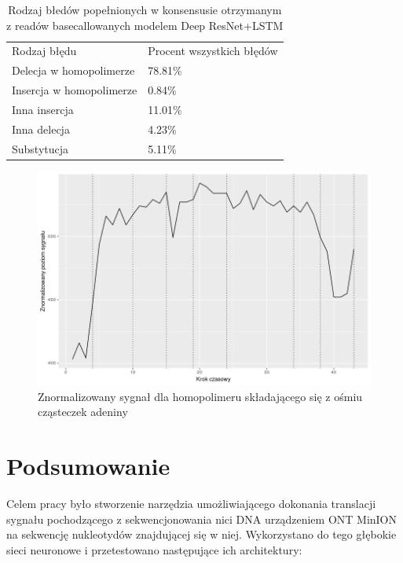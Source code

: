 \documentclass[a4paper,11pt,twoside]{report}
\theoremstyle{definition}
\begin{document}
\begin{table}[]
	\begin{tabular}{ll}
		Rodzaj błędu             & Procent wszystkich błędów \\
		Delecja w homopolimerze  & 78.81\%                   \\
		Insercja w homopolimerze & 0.84\%                    \\
		Inna insercja            & 11.01\%                   \\
		Inna delecja             & 4.23\%                    \\
		Substytucja              & 5.11\%                   
	\end{tabular}
	\caption{Rodzaj błedów popełnionych w konsensusie otrzymanym z readów basecallowanych modelem Deep ResNet+LSTM}
	\label{table:errors}
\end{table}

\begin{figure}[h!]
	\centering
	\includegraphics[scale=0.7]{homopolymer}
	\caption{Znormalizowany sygnał dla homopolimeru składającego się z ośmiu cząsteczek adeniny }
	\label{fig:homopolymer}
\end{figure}

\chapter{Podsumowanie}

Celem pracy było stworzenie narzędzia umożliwiającego dokonania translacji sygnału pochodzącego z sekwencjonowania nici DNA urządzeniem ONT MinION na sekwencję nukleotydów znajdującej się w niej. Wykorzystano do tego głębokie sieci neuronowe i przetestowano następujące ich architektury:
\end{document}
